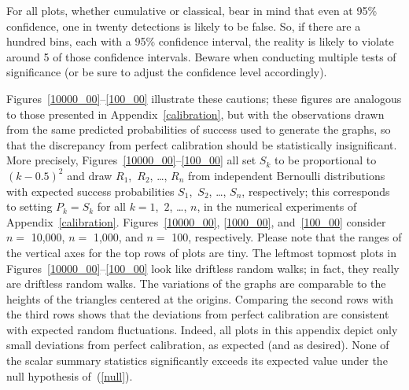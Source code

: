 \documentclass{article}
\begin{document}
For all plots, whether cumulative or classical,
bear in mind that even at 95\% confidence, one in twenty detections
is likely to be false. So, if there are a hundred bins,
each with a 95\% confidence interval, the reality is likely to violate
around 5 of those confidence intervals.
Beware when conducting multiple tests of significance
(or be sure to adjust the confidence level accordingly).

Figures~\ref{10000_00}--\ref{100_00} illustrate these cautions;
these figures are analogous to those presented in Appendix~\ref{calibration},
but with the observations drawn from the same predicted probabilities
of success used to generate the graphs, so that the discrepancy
from perfect calibration should be statistically insignificant.
More precisely, Figures~\ref{10000_00}--\ref{100_00}
all set $S_k$ to be proportional to $(k-0.5)^2$
and draw $R_1$,~$R_2$, \dots, $R_n$ from independent Bernoulli distributions
with expected success probabilities $S_1$,~$S_2$, \dots, $S_n$, respectively;
this corresponds to setting $P_k = S_k$ for all $k = 1$,~$2$, \dots, $n$,
in the numerical experiments of Appendix~\ref{calibration}.
Figures~\ref{10000_00}, \ref{1000_00}, and~\ref{100_00}
consider $n =$ 10,000, $n =$ 1,000, and $n =$ 100, respectively.
Please note that the ranges of the vertical axes
for the top rows of plots are tiny.
The leftmost topmost plots in Figures~\ref{10000_00}--\ref{100_00}
look like driftless random walks;
in fact, they really are driftless random walks.
The variations of the graphs are comparable to the heights
of the triangles centered at the origins.
Comparing the second rows with the third rows
shows that the deviations from perfect calibration
are consistent with expected random fluctuations.
Indeed, all plots in this appendix depict only small deviations
from perfect calibration, as expected (and as desired).
None of the scalar summary statistics significantly exceeds
its expected value under the null hypothesis of~(\ref{null}).
\end{document}

